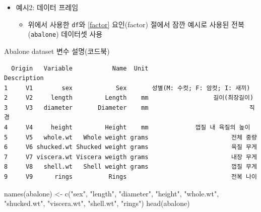 \documentclass[
  11pt,
]{krantz}
\makeatletter
\newenvironment{Shaded}{\begin{snugshade}}{\end{snugshade}}
\newcommand{\FunctionTok}[1]{\textcolor[rgb]{0,0,0}{#1}}
\newcommand{\NormalTok}[1]{#1}
\newcommand{\OtherTok}[1]{\textcolor[rgb]{0.37,0.37,0.37}{#1}}
\newcommand{\StringTok}[1]{\textcolor[rgb]{0.5,0.5,0.5}{#1}}
\providecommand{\tightlist}{%
  \setlength{\itemsep}{0pt}\setlength{\parskip}{0pt}}
\newenvironment{kframe}{%
\medskip{}
\setlength{\fboxsep}{.8em}
 \def\at@end@of@kframe{}%
 \ifinner\ifhmode%
  \def\at@end@of@kframe{\end{minipage}}%
  \begin{minipage}{\columnwidth}%
 \fi\fi%
 \def\FrameCommand##1{\hskip\@totalleftmargin \hskip-\fboxsep
 \colorbox{shadecolor}{##1}\hskip-\fboxsep
     \hskip-\linewidth \hskip-\@totalleftmargin \hskip\columnwidth}%
 \MakeFramed {\advance\hsize-\width
   \@totalleftmargin\z@ \linewidth\hsize
   \@setminipage}}%
 {\par\unskip\endMakeFramed%
 \at@end@of@kframe}
\newenvironment{rmdblock}[1]
  {
  \begin{itemize}
  \renewcommand{\labelitemi}{
    \raisebox{-.7\height}[0pt][0pt]{
      {\setkeys{Gin}{width=3em,keepaspectratio}\texttt{[image: images/\#1]}}
    }
  }
  \setlength{\fboxsep}{1em}
  \begin{kframe}
  \item
  }
  {
  \end{kframe}
  \end{itemize}
  }
\newenvironment{rmdnote}
  {\begin{rmdblock}{note}}
  {\end{rmdblock}}
\makeatother
\begin{document}
\normalsize

\begin{itemize}
\tightlist
\item
  예시2: 데이터 프레임

  \begin{itemize}
  \tightlist
  \item
    위에서 사용한 \texttt{df}와 \ref{factor} 요인(factor) 절에서 잠깐 예시로 사용된 전복(\texttt{abalone}) 데이터셋 사용
  \end{itemize}
\end{itemize}

\footnotesize

\begin{rmdnote}
Abalone dataset 변수 설명(코드북)
\end{rmdnote}

\normalsize

\footnotesize

\begin{verbatim}
  Origin   Variable           Name  Unit                     Description
1     V1        sex            Sex       성별(M: 수컷; F: 암컷; I: 새끼)
2     V2     length         Length    mm                  길이(최장길이)
3     V3   diameter       Diameter    mm                            직경
4     V4     height         Height    mm             껍질 내 육질의 높이
5     V5   whole.wt   Whole weight grams                       전체 중량
6     V6 shucked.wt Shucked weight grams                       육질 무게
7     V7 viscera.wt Viscera weigth grams                       내장 무게
8     V8   shell.wt   Shell weight grams                       껍질 무게
9     V9      rings          Rings                             전복 나이
\end{verbatim}

\normalsize

\footnotesize

\begin{Shaded}
\begin{Highlighting}[]
\FunctionTok{names}\NormalTok{(abalone) }\OtherTok{\textless{}{-}} \FunctionTok{c}\NormalTok{(}\StringTok{"sex"}\NormalTok{, }\StringTok{"length"}\NormalTok{, }\StringTok{"diameter"}\NormalTok{, }
                    \StringTok{"height"}\NormalTok{, }\StringTok{"whole.wt"}\NormalTok{, }
                    \StringTok{"shucked.wt"}\NormalTok{, }\StringTok{"viscera.wt"}\NormalTok{, }
                    \StringTok{"shell.wt"}\NormalTok{, }\StringTok{"rings"}\NormalTok{)}
\FunctionTok{head}\NormalTok{(abalone)}
\end{Highlighting}
\end{Shaded}
\end{document}
